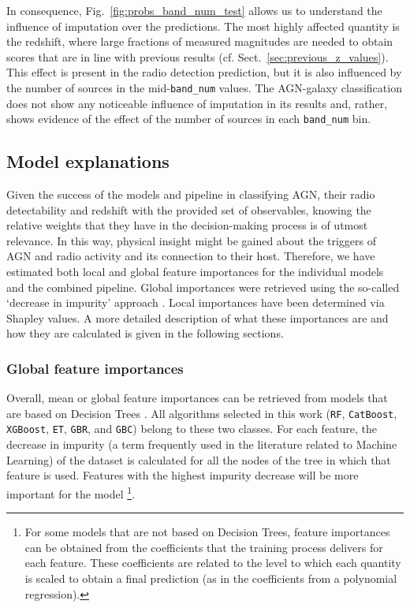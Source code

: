 \documentclass{aa}
\begin{document}
In consequence, Fig.~\ref{fig:probs_band_num_test} allows us to understand the influence of imputation over the predictions. The most highly affected quantity is the redshift, where large fractions of measured magnitudes are needed to obtain scores that are in line with previous results (cf. Sect.~\ref{sec:previous_z_values}). This effect is present in the radio detection prediction, but it is also influenced by the number of sources in the mid-\texttt{band\_num} values. The AGN-galaxy classification does not show any noticeable influence of imputation in its results and, rather, shows evidence of the effect of the number of sources in each \texttt{band\_num} bin.

\subsection{Model explanations}\label{sec:model_explain}

Given the success of the models and pipeline in classifying AGN, their radio detectability and redshift with the provided set of observables, knowing the relative weights that they have in the decision-making process is of utmost relevance. In this way, physical insight might be gained about the triggers of AGN and radio activity and its connection to their host.
Therefore, we have estimated both local and global feature importances for the individual models and the combined pipeline. Global importances were retrieved using the so-called `decrease in impurity' approach \citep[see, for example,][]{Breiman2001}. Local importances have been determined via Shapley values. A more detailed description of what these importances are and how they are calculated is given in the following sections.

\subsubsection{Global feature importances}\label{sec:feat_importances}

Overall, mean or global feature importances can be retrieved from models that are based on Decision Trees \citep[e.g. Random Forests and Boosting models,][]{Breiman2001, breiman2003manual}. All algorithms selected in this work (\verb|RF|, \verb|CatBoost|, \verb|XGBoost|, \verb|ET|, \verb|GBR|, and \verb|GBC|) belong to these two classes. For each feature, the decrease in impurity (a term frequently used in the literature related to Machine Learning) of the dataset is calculated for all the nodes of the tree in which that feature is used. Features with the highest impurity decrease will be more important for the model \citep{NIPS2013_e3796ae8}\footnote{For some models that are not based on Decision Trees, feature importances can be obtained from the coefficients that the training process delivers for each feature. These coefficients are related to the level to which each quantity is scaled to obtain a final prediction (as in the coefficients from a polynomial regression).}.
\end{document}
